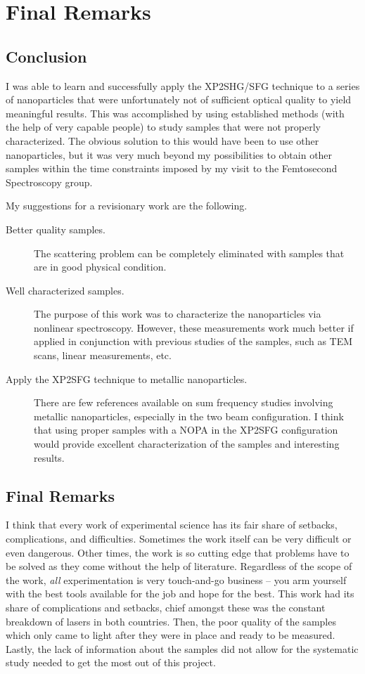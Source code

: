 \chapter{Final Remarks}\label{chap_conc}
\minitoc
\section{Conclusion}
I was able to learn and successfully apply the XP2SHG/SFG technique to a series of nanoparticles that were unfortunately not of sufficient optical quality to yield meaningful results. This was accomplished by using established methods (with the help of very capable people) to study samples that were not properly characterized. The obvious solution to this would have been to use other nanoparticles, but it was very much beyond my possibilities to obtain other samples within the time constraints imposed by my visit to the Femtosecond Spectroscopy group.

My suggestions for a revisionary work are the following.

\begin{description}
\item[Better quality samples.] The scattering problem can be completely eliminated with samples that are in good physical condition.
\item[Well characterized samples.] The purpose of this work was to characterize the nanoparticles via nonlinear spectroscopy. However, these measurements work much better if applied in conjunction with previous studies of the samples, such as TEM scans, linear measurements, etc.
\item[Apply the XP2SFG technique to metallic nanoparticles.] There are few references available on sum frequency studies involving metallic nanoparticles, especially in the two beam configuration. I think that using proper samples with a NOPA in the XP2SFG configuration would provide excellent characterization of the samples and interesting results.
\end{description}

\section{Final Remarks}
I think that every work of experimental science has its fair share of setbacks, complications, and difficulties. Sometimes the work itself can be very difficult or even dangerous. Other times, the work is so cutting edge that problems have to be solved as they come without the help of literature. Regardless of the scope of the work, \emph{all} experimentation is very touch-and-go business -- you arm yourself with the best tools available for the job and hope for the best. This work had its share of complications and setbacks, chief amongst these was the constant breakdown of lasers in both countries. Then, the poor quality of the samples which only came to light after they were in place and ready to be measured. Lastly, the lack of information about the samples did not allow for the systematic study needed to get the most out of this project.

